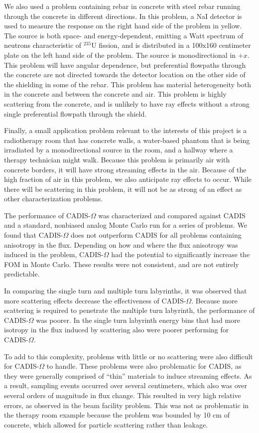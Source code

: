 \documentclass[12pt]{article}
\begin{document}
We also used a problem containing rebar in concrete with steel rebar running through
the concrete in different directions. In this problem, a NaI detector is
used to measure the response on the right hand side of the problem in yellow.
The source is both space- and energy-dependent, emitting a Watt spectrum of
neutrons characteristic of $^{235}$U fission, and is distributed in a 100x160
centimeter plate
on the left hand side of the problem. The source is monodirectional in $+x$.
This problem will have angular
dependence, but preferential flowpaths through the concrete are not directed
towards the detector location on the other side of the shielding in some of the
rebar. This problem has material heterogeneity both in the concrete and between
the concrete and air. This problem is highly scattering from the concrete, and
is unlikely to have ray effects without a strong single preferential flowpath
through the shield.

Finally, a small application problem relevant to the interests of this project is a
radiotherapy room that has concrete
walls, a water-based phantom that is being irradiated by a monodirectional
source in the room, and a hallway where a therapy technician might walk.  Because this problem is primarily air with concrete
borders, it will have strong streaming effects in the air. 
Because of the high fraction of air in this problem, we also anticipate
ray effects to occur. While there will be scattering in this problem, it will
not be as strong of an effect as other characterization problems.

The performance of CADIS-$\Omega$ was characterized and compared against
CADIS and a standard, nonbiased analog Monte Carlo run for a series of problems.
We found that CADIS-$\Omega$ does not outperform
CADIS for all problems containing anisotropy in the flux. Depending on how and
where the flux
anisotropy was induced in the problem, CADIS-$\Omega$ had the potential to
significantly increase the FOM in Monte Carlo. These results were not
consistent, and are not entirely predictable.

In comparing the single turn and multiple turn labyrinths, it was observed that
more scattering effects decrease the effectiveness of CADIS-$\Omega$. Because
more scattering is required to penetrate the multiple turn labyrinth,
the performance of CADIS-$\Omega$ was poorer. In the single turn labyrinth
energy bins that had more isotropy in the flux induced by scattering also were
poorer performing for CADIS-$\Omega$.

To add to this complexity, problems with little or no scattering were also
difficult for CADIS-$\Omega$ to handle. These problems were also problematic for
CADIS, as they were generally comprised of ``thin'' materials to induce
streaming effects. As a result, sampling events occurred over several
centimeters, which also was over several orders of magnitude in flux change.
This resulted in very high relative errors, as observed in the beam facility
problem. This was not as problematic in the therapy room example because the
problem was bounded by 10 cm of concrete, which allowed for particle scattering
rather than leakage.
\end{document}
